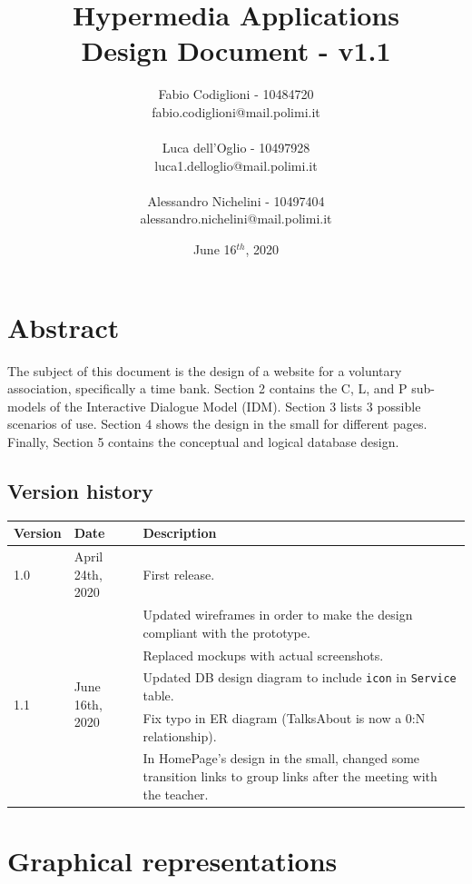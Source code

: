\documentclass[a4paper, 11pt, parskip=half, headsepline]{scrreprt}
\title{Hypermedia Applications\\Design Document - v1.1}
\author{Fabio Codiglioni - 10484720\\fabio.codiglioni@mail.polimi.it\\\\Luca dell'Oglio - 10497928\\luca1.delloglio@mail.polimi.it\\\\Alessandro Nichelini - 10497404\\alessandro.nichelini@mail.polimi.it}
\date{June 16$^{th}$, 2020}
\begin{document}
\maketitle
\tableofcontents
\newpage
{}


\chapter{Abstract}
The subject of this document is the design of a website for a voluntary association, specifically a time bank. Section 2 contains the C, L, and P sub-models of the Interactive Dialogue Model (IDM). Section 3 lists 3 possible scenarios of use. Section 4 shows the design in the small for different pages. Finally, Section 5 contains the conceptual and logical database design.

\section{Version history}

\begin{table}[H]
    \centering
    \def\arraystretch{1.25}
    \begin{tabular}{|l|l|m{7cm}|}
        \hline
        \textbf{Version} & \textbf{Date} & \textbf{Description} \\ \hline
        1.0 & April 24th, 2020 & First release. \\ \hline
        \multirow{5}{*}{1.1} & \multirow{5}{*}{June 16th, 2020} & Updated wireframes in order to make the design compliant with the prototype. \\
        & & Replaced mockups with actual screenshots. \\
        & & Updated DB design diagram to include \texttt{icon} in \texttt{Service} table. \\
        & & Fix typo in ER diagram (TalksAbout is now a 0:N relationship). \\
        & & In HomePage's design in the small, changed some transition links to group links after the meeting with the teacher. \\ \hline
    \end{tabular}
\end{table}


\chapter{Graphical representations}
\end{document}
